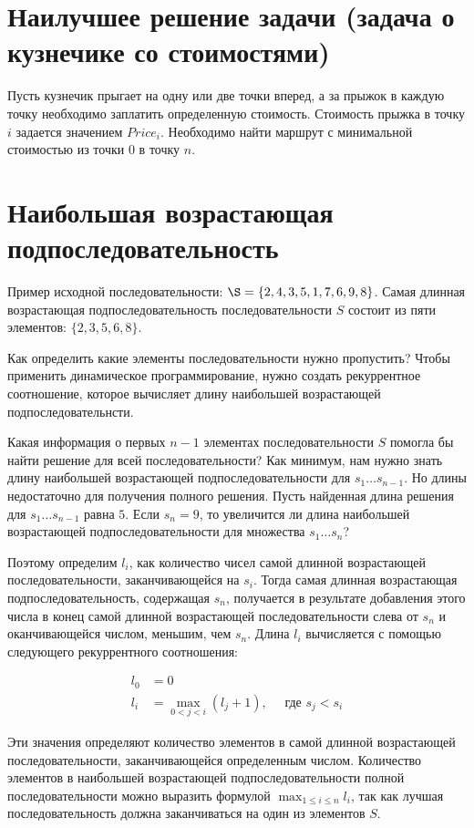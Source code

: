 \section{Наилучшее решение задачи (задача о кузнечике со стоимостями)}

Пусть кузнечик прыгает на одну или две точки вперед, а за прыжок в каждую точку необходимо заплатить определенную стоимость. Стоимость прыжка в точку $i$ задается значением $Price_i$. Необходимо найти маршрут с минимальной стоимостью из точки $0$ в точку $n$.

\section{Наибольшая возрастающая подпоследовательность}

Пример исходной последовательности: $\S=\{2,4,3,5,1,7,6,9,8\}$. Самая длинная возрастающая
подпоследовательность последовательности $S$ состоит из пяти элементов: $\{2,3,5,6,8\}$.

Как определить какие элементы последовательности нужно пропустить? Чтобы применить динамическое
программирование, нужно создать рекуррентное соотношение, которое вычисляет длину
наибольшей возрастающей подпоследовательнсти.

Какая информация о первых $n-1$ элементах последовательности $S$ помогла бы найти решение для
всей последовательности? Как минимум, нам нужно знать длину наибольшей возрастающей 
подпоследовательности для $s_1 \ldots s_{n-1}$. Но длины недостаточно для получения полного
решения. Пусть найденная длина решения для $s_1 \ldots s_{n-1}$ равна $5$. Если $s_n = 9$,
то увеличится ли длина наибольшей возрастающей подпоследовательности для множества
$s_1 \ldots s_n$?

Поэтому определим $l_i$, как количество чисел самой длинной возрастающей последовательности,
заканчивающейся на $s_i$. Тогда самая длинная возрастающая подпоследовательность, содержащая
$s_n$, получается в результате добавления этого числа в конец самой длинной возрастающей
последовательности слева от $s_n$ и оканчивающейся числом, меньшим, чем $s_n$. Длина $l_i$
вычисляется с помощью следующего рекуррентного соотношения:

\begin{align*}
l_0 &= 0 \\
l_i &= \max_{0<j<i}(l_j + 1), \quad \text{ где $s_j < s_i$}
\end{align*}

Эти значения определяют количество элементов в самой длинной возрастающей последовательности,
заканчивающейся определенным числом. Количество элементов в наибольшей возрастающей
подпоследовательности полной последовательности можно выразить формулой $\max_{1\le i\le n}l_i$,
так как лучшая последовательность должна заканчиваться на один из элементов $S$.

